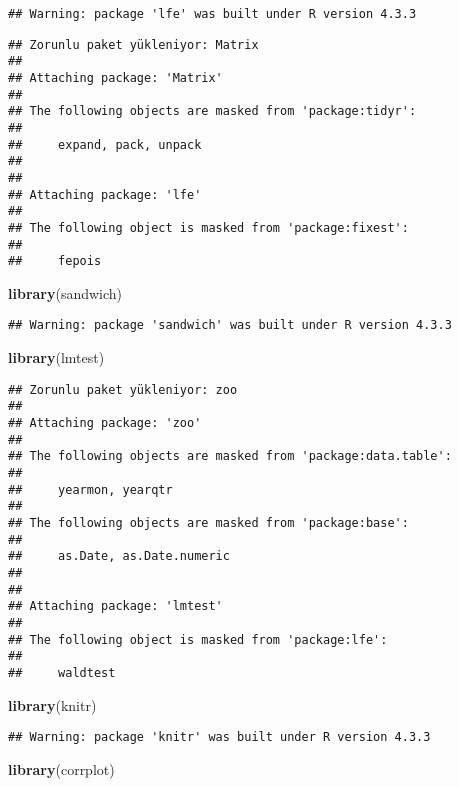 \documentclass[
]{article}
\newenvironment{Shaded}{\begin{snugshade}}{\end{snugshade}}
\newcommand{\FunctionTok}[1]{\textcolor[rgb]{0.13,0.29,0.53}{\textbf{#1}}}
\newcommand{\NormalTok}[1]{#1}
\begin{document}
\begin{verbatim}
## Warning: package 'lfe' was built under R version 4.3.3
\end{verbatim}

\begin{verbatim}
## Zorunlu paket yükleniyor: Matrix
## 
## Attaching package: 'Matrix'
## 
## The following objects are masked from 'package:tidyr':
## 
##     expand, pack, unpack
## 
## 
## Attaching package: 'lfe'
## 
## The following object is masked from 'package:fixest':
## 
##     fepois
\end{verbatim}

\begin{Shaded}
\begin{Highlighting}[]
\FunctionTok{library}\NormalTok{(sandwich)}
\end{Highlighting}
\end{Shaded}

\begin{verbatim}
## Warning: package 'sandwich' was built under R version 4.3.3
\end{verbatim}

\begin{Shaded}
\begin{Highlighting}[]
\FunctionTok{library}\NormalTok{(lmtest)}
\end{Highlighting}
\end{Shaded}

\begin{verbatim}
## Zorunlu paket yükleniyor: zoo
## 
## Attaching package: 'zoo'
## 
## The following objects are masked from 'package:data.table':
## 
##     yearmon, yearqtr
## 
## The following objects are masked from 'package:base':
## 
##     as.Date, as.Date.numeric
## 
## 
## Attaching package: 'lmtest'
## 
## The following object is masked from 'package:lfe':
## 
##     waldtest
\end{verbatim}

\begin{Shaded}
\begin{Highlighting}[]
\FunctionTok{library}\NormalTok{(knitr)}
\end{Highlighting}
\end{Shaded}

\begin{verbatim}
## Warning: package 'knitr' was built under R version 4.3.3
\end{verbatim}

\begin{Shaded}
\begin{Highlighting}[]
\FunctionTok{library}\NormalTok{(corrplot)}
\end{Highlighting}
\end{Shaded}
\end{document}
